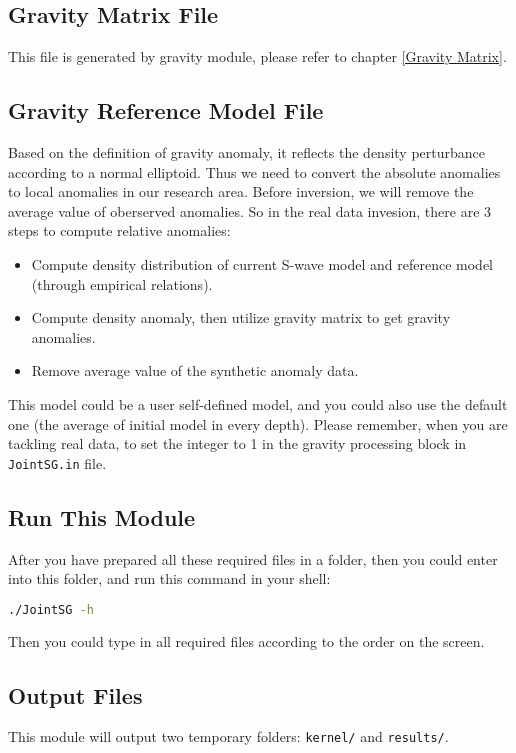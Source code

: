 \documentclass[UTF8]{article}
\begin{document}
\subsection{Gravity Matrix File}
This file is generated by gravity module, please refer to 
chapter \ref{Gravity Matrix}.

\subsection{Gravity Reference Model File}\label{Gravref}
Based on the definition of gravity anomaly, it reflects the 
density perturbance according to a normal elliptoid. Thus we need 
to convert the absolute anomalies to local anomalies in our research 
area. Before inversion, we will remove the average value of 
oberserved anomalies. So in the real data 
invesion, there are 3 steps to compute relative anomalies:
\begin{itemize}
    \item Compute density distribution of 
        current S-wave model and reference model (through
        empirical relations).
    \item Compute density anomaly, then utilize gravity matrix
          to get gravity anomalies.
    \item Remove average value of the synthetic anomaly data.
\end{itemize}
This model could be a user self-defined model, and you could also use the 
default one (the average of initial model in every depth). Please 
remember, when you are tackling real data, to set the integer to 1 in the gravity processing block 
in \texttt{JointSG.in} file. 

\subsection{Run This Module}
After you have prepared all these required files in a folder, 
then you could enter into this folder, and run this command 
in your shell:
\begin{lstlisting}[language=bash]
./JointSG -h
\end{lstlisting}
Then you could type in all required files according to the 
order on the screen.

\subsection{Output Files}
This module will output two temporary folders: 
\verb!kernel/! and \verb!results/!. \\
\end{document}
